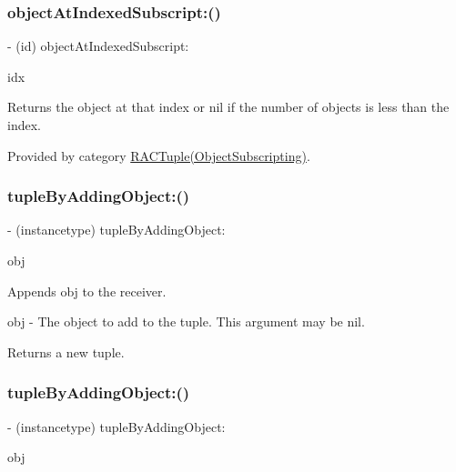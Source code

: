 \subsubsection{\texorpdfstring{object\+At\+Indexed\+Subscript\+:()}{objectAtIndexedSubscript:()}\hspace{0.1cm}{\footnotesize\ttfamily [3/3]}}
{\footnotesize\ttfamily -\/ (id) object\+At\+Indexed\+Subscript\+: \begin{DoxyParamCaption}\item[{(N\+S\+U\+Integer)}]{idx }\end{DoxyParamCaption}}

Returns the object at that index or nil if the number of objects is less than the index. 

Provided by category \mbox{\hyperlink{category_r_a_c_tuple_07_object_subscripting_08_ad2360332f752318fc924727c17eb67c9}{R\+A\+C\+Tuple(\+Object\+Subscripting)}}.

\mbox{\label{interface_r_a_c_tuple_a9ad29985f13aa286f5923ca4c98d30a5}} 
\subsubsection{\texorpdfstring{tuple\+By\+Adding\+Object\+:()}{tupleByAddingObject:()}\hspace{0.1cm}{\footnotesize\ttfamily [1/3]}}
{\footnotesize\ttfamily -\/ (instancetype) tuple\+By\+Adding\+Object\+: \begin{DoxyParamCaption}\item[{(id)}]{obj }\end{DoxyParamCaption}}

Appends {\ttfamily obj} to the receiver.

obj -\/ The object to add to the tuple. This argument may be nil.

Returns a new tuple. \mbox{\label{interface_r_a_c_tuple_a9ad29985f13aa286f5923ca4c98d30a5}} 
\subsubsection{\texorpdfstring{tuple\+By\+Adding\+Object\+:()}{tupleByAddingObject:()}\hspace{0.1cm}{\footnotesize\ttfamily [2/3]}}
{\footnotesize\ttfamily -\/ (instancetype) tuple\+By\+Adding\+Object\+: \begin{DoxyParamCaption}\item[{(id)}]{obj }\end{DoxyParamCaption}}

